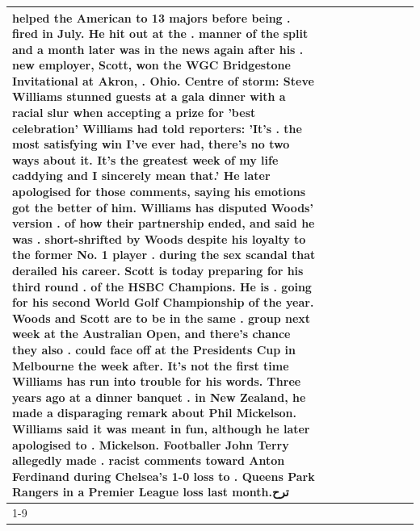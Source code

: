 \begin{table}[H]
\begin{tabular}{lllrlllll}
helped the American to 13 majors before being . fired in July. He hit out at the . manner of the split and a month later was in the news again after his . new employer, Scott, won the WGC Bridgestone Invitational at Akron, . Ohio. Centre of storm: Steve Williams stunned guests at a gala dinner with a racial slur when accepting a prize for 'best celebration' Williams had told reporters: 'It's . the most satisfying win I've ever had, there's no two ways about it. It's the greatest week of my life caddying and I sincerely mean that.' He later apologised for those comments, saying his emotions got the better of him. Williams has disputed Woods' version . of how their partnership ended, and said he was . short-shrifted by Woods despite his loyalty to the former No. 1 player . during the sex scandal that derailed his career. Scott is today preparing for his third round . of the HSBC Champions. He is . going for his second World Golf Championship of the year. Woods and Scott are to be in the same . group next week at the Australian Open, and there's chance they also . could face off at the Presidents Cup in Melbourne the week after. It's not the first time Williams has run into trouble for his words. Three years ago at a dinner banquet . in New Zealand, he made a disparaging remark about Phil Mickelson. Williams said it was meant in fun, although he later apologised to . Mickelson. Footballer John Terry allegedly made . racist comments toward Anton Ferdinand during Chelsea's 1-0 loss to . Queens Park Rangers in a Premier League loss last month.ترح \\
\cline{1-9}

\end{tabular}
\end{table}
